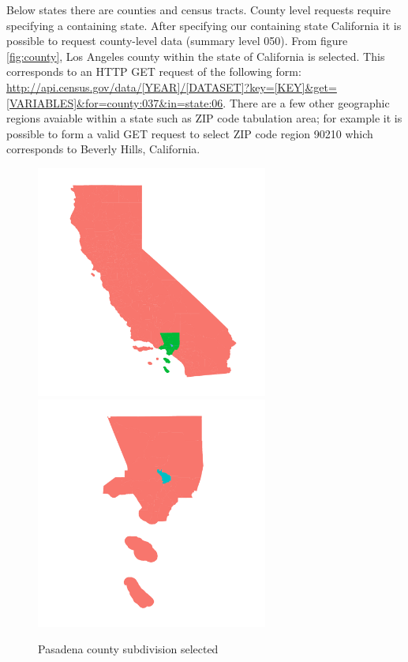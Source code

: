 \documentclass{article}\usepackage[]{graphicx}\usepackage[]{color}
\newenvironment{knitrout}{}{} %
\begin{document}
Below states there are counties and census tracts.  County level requests require specifying a containing state.  After specifying our containing state California it is possible to request county-level data (summary level 050).  From figure \ref{fig:county}, Los Angeles county within the state of California is selected.  This corresponds to an HTTP GET request of the following form: \url{http://api.census.gov/data/[YEAR]/[DATASET]?key=[KEY]&get=[VARIABLES]&for=county:037&in=state:06}.  There are a few other geographic regions avaiable within a state such as ZIP code tabulation area; for example it is possible to form a valid GET request to select ZIP code region 90210 which corresponds to Beverly Hills, California.\\
\begin{knitrout}
\color{fgcolor}\begin{figure}[]


{\centering \includegraphics[width=3in]{figure/censustractstate1} 
\includegraphics[width=3in]{figure/censustractstate2} 

}

\caption[Pasadena county subdivision selected]{Pasadena county subdivision selected\label{fig:censustractstate}}
\end{figure}


\end{knitrout}
\end{document}
